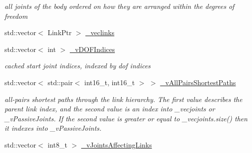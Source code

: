 \begin{DoxyCompactItemize}
\begin{DoxyCompactList}\small\item\em all joints of the body ordered on how they are arranged within the degrees of freedom \item\end{DoxyCompactList}\item 
std::vector$<$ LinkPtr $>$ \hyperlink{classOpenRAVE_1_1KinBody_a02bf557ce0bba8374b863ce9f20de255}{\_\-veclinks}
\item 
\hypertarget{classOpenRAVE_1_1KinBody_ac520bd29ce01d4f20bc6a297630dbf10}{
std::vector$<$ int $>$ \hyperlink{classOpenRAVE_1_1KinBody_ac520bd29ce01d4f20bc6a297630dbf10}{\_\-vDOFIndices}}
\label{classOpenRAVE_1_1KinBody_ac520bd29ce01d4f20bc6a297630dbf10}

\begin{DoxyCompactList}\small\item\em cached start joint indices, indexed by dof indices \item\end{DoxyCompactList}\item 
\hypertarget{classOpenRAVE_1_1KinBody_ad4fcd86b85624e749100cd60c0a9fccf}{
std::vector$<$ std::pair$<$ int16\_\-t, int16\_\-t $>$ $>$ \hyperlink{classOpenRAVE_1_1KinBody_ad4fcd86b85624e749100cd60c0a9fccf}{\_\-vAllPairsShortestPaths}}
\label{classOpenRAVE_1_1KinBody_ad4fcd86b85624e749100cd60c0a9fccf}

\begin{DoxyCompactList}\small\item\em all-\/pairs shortest paths through the link hierarchy. The first value describes the parent link index, and the second value is an index into \_\-vecjoints or \_\-vPassiveJoints. If the second value is greater or equal to \_\-vecjoints.size() then it indexes into \_\-vPassiveJoints. \item\end{DoxyCompactList}\item 
\hypertarget{classOpenRAVE_1_1KinBody_a5a4ac058401dd5f4ec5da0e7c1f719e2}{
std::vector$<$ int8\_\-t $>$ \hyperlink{classOpenRAVE_1_1KinBody_a5a4ac058401dd5f4ec5da0e7c1f719e2}{\_\-vJointsAffectingLinks}}
\label{classOpenRAVE_1_1KinBody_a5a4ac058401dd5f4ec5da0e7c1f719e2}


\end{DoxyCompactItemize}
